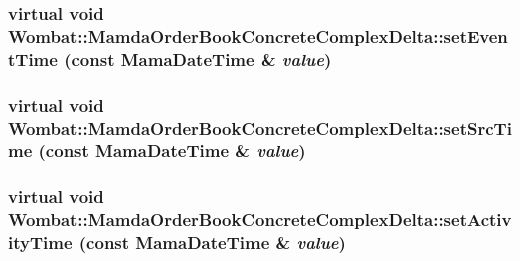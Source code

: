 \hypertarget{classWombat_1_1MamdaOrderBookConcreteComplexDelta_da4466ea7d5bc20bd5d6a243f30ffafb}{
\subsubsection[setEventTime]{\setlength{\rightskip}{0pt plus 5cm}virtual void Wombat::Mamda\-Order\-Book\-Concrete\-Complex\-Delta::set\-Event\-Time (const Mama\-Date\-Time \& {\em value})}}
\label{classWombat_1_1MamdaOrderBookConcreteComplexDelta_da4466ea7d5bc20bd5d6a243f30ffafb}


\hypertarget{classWombat_1_1MamdaOrderBookConcreteComplexDelta_927bbe6acd393a14fe6c79a7e6a53f56}{
\subsubsection[setSrcTime]{\setlength{\rightskip}{0pt plus 5cm}virtual void Wombat::Mamda\-Order\-Book\-Concrete\-Complex\-Delta::set\-Src\-Time (const Mama\-Date\-Time \& {\em value})}}
\label{classWombat_1_1MamdaOrderBookConcreteComplexDelta_927bbe6acd393a14fe6c79a7e6a53f56}


\hypertarget{classWombat_1_1MamdaOrderBookConcreteComplexDelta_a81a4980b1f94545ea7c11399c6f6b38}{
\subsubsection[setActivityTime]{\setlength{\rightskip}{0pt plus 5cm}virtual void Wombat::Mamda\-Order\-Book\-Concrete\-Complex\-Delta::set\-Activity\-Time (const Mama\-Date\-Time \& {\em value})}}
\label{classWombat_1_1MamdaOrderBookConcreteComplexDelta_a81a4980b1f94545ea7c11399c6f6b38}



